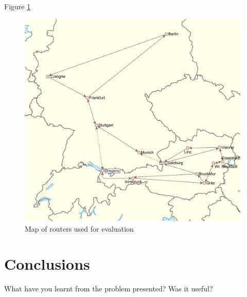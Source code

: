 \documentclass[a4paper, 11pt]{article}
\begin{document}
Figure \ref{fig:map1}
\begin{figure}[H]
  \begin{center}
    \includegraphics[width=\textwidth]{graphics/map_routy.pdf}
    \caption{Map of routers used for evaluation}
    \label{fig:map1}
  \end{center}
\end{figure}

\section{Conclusions}

What have you learnt from the problem presented?
Was it useful?
\end{document}
